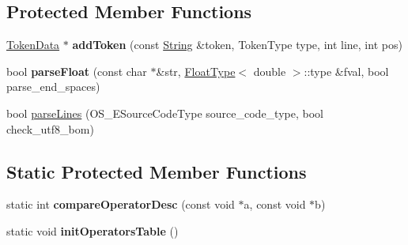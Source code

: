 \subsection*{Protected Member Functions}
\begin{DoxyCompactItemize}
\item 
\hyperlink{class_object_script_1_1_o_s_1_1_core_1_1_tokenizer_1_1_token_data}{Token\+Data} $\ast$ {\bfseries add\+Token} (const \hyperlink{class_object_script_1_1_o_s_1_1_core_1_1_string}{String} \&token, Token\+Type type, int line, int pos)\hypertarget{class_object_script_1_1_o_s_1_1_core_1_1_tokenizer_a9033f23cc568e4baeaf938690a9bd3e5}{}\label{class_object_script_1_1_o_s_1_1_core_1_1_tokenizer_a9033f23cc568e4baeaf938690a9bd3e5}

\item 
bool {\bfseries parse\+Float} (const char $\ast$\&str, \hyperlink{struct_object_script_1_1_float_type}{Float\+Type}$<$ double $>$\+::type \&fval, bool parse\+\_\+end\+\_\+spaces)\hypertarget{class_object_script_1_1_o_s_1_1_core_1_1_tokenizer_a77df66dc84a560e9878d7c38c561dc8e}{}\label{class_object_script_1_1_o_s_1_1_core_1_1_tokenizer_a77df66dc84a560e9878d7c38c561dc8e}

\item 
bool \hyperlink{class_object_script_1_1_o_s_1_1_core_1_1_tokenizer_a9c3beccb47d11acf41a40bf5f32080c0}{parse\+Lines} (O\+S\+\_\+\+E\+Source\+Code\+Type source\+\_\+code\+\_\+type, bool check\+\_\+utf8\+\_\+bom)
\end{DoxyCompactItemize}
\subsection*{Static Protected Member Functions}
\begin{DoxyCompactItemize}
\item 
static int {\bfseries compare\+Operator\+Desc} (const void $\ast$a, const void $\ast$b)\hypertarget{class_object_script_1_1_o_s_1_1_core_1_1_tokenizer_a8ec66590291148844378ca1fa3a8c596}{}\label{class_object_script_1_1_o_s_1_1_core_1_1_tokenizer_a8ec66590291148844378ca1fa3a8c596}

\item 
static void {\bfseries init\+Operators\+Table} ()\hypertarget{class_object_script_1_1_o_s_1_1_core_1_1_tokenizer_aa8fdd01f409b36a17b5b2981a1946e5f}{}\label{class_object_script_1_1_o_s_1_1_core_1_1_tokenizer_aa8fdd01f409b36a17b5b2981a1946e5f}

\end{DoxyCompactItemize}
